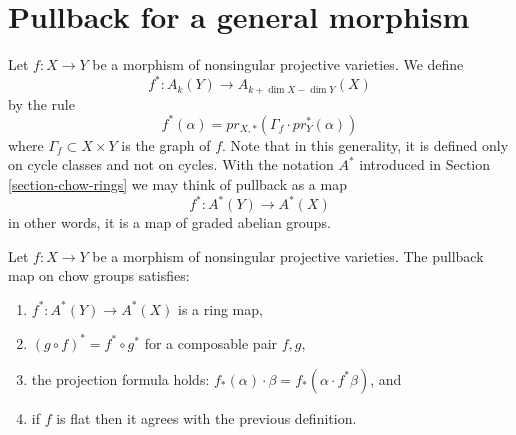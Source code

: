 \section{Pullback for a general morphism}
\label{section-general-pullback}

\noindent
Let $f : X \to Y$ be a morphism of nonsingular projective varieties.
We define
$$
f^* : A_k(Y) \to A_{k+\dim X - \dim Y}(X)
$$
by the rule
$$
f^*(\alpha) = pr_{X, *}(\Gamma_f \cdot pr_Y^*(\alpha))
$$
where $\Gamma_f \subset X\times Y$ is the graph of $f$. Note that in this
generality, it is defined only on cycle classes and not on cycles. With the
notation $A^*$ introduced in Section \ref{section-chow-rings}
we may think of pullback as a map
$$
f^* : A^*(Y) \to A^*(X)
$$
in other words, it is a map of graded abelian groups.

\begin{lemma}
\label{lemma-pullback-and-intersection-product}
Let $f : X \to Y$ be a morphism of nonsingular projective varieties.
The pullback map on chow groups satisfies:
\begin{enumerate}
\item $f^* : A^*(Y) \to A^*(X)$ is a ring map,
\item $(g \circ f)^* = f^* \circ g^*$ for a composable pair $f, g$,
\item the projection formula holds: $f_*(\alpha) \cdot \beta =
f_*( \alpha \cdot f^*\beta)$, and
\item if $f$ is flat then it agrees with the previous definition.
\end{enumerate}
\end{lemma}

